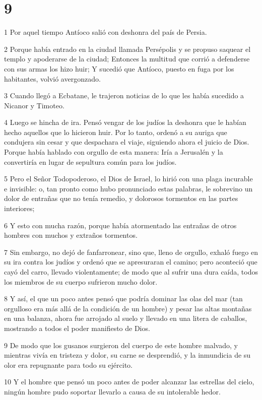 \chapter{9}

\par 1 Por aquel tiempo Antíoco salió con deshonra del país de Persia.
\par 2 Porque había entrado en la ciudad llamada Persépolis y se propuso saquear el templo y apoderarse de la ciudad; Entonces la multitud que corrió a defenderse con sus armas los hizo huir; Y sucedió que Antíoco, puesto en fuga por los habitantes, volvió avergonzado.
\par 3 Cuando llegó a Ecbatane, le trajeron noticias de lo que les había sucedido a Nicanor y Timoteo.
\par 4 Luego se hincha de ira. Pensó vengar de los judíos la deshonra que le habían hecho aquellos que lo hicieron huir. Por lo tanto, ordenó a su auriga que condujera sin cesar y que despachara el viaje, siguiendo ahora el juicio de Dios. Porque había hablado con orgullo de esta manera: Iría a Jerusalén y la convertiría en lugar de sepultura común para los judíos.
\par 5 Pero el Señor Todopoderoso, el Dios de Israel, lo hirió con una plaga incurable e invisible: o, tan pronto como hubo pronunciado estas palabras, le sobrevino un dolor de entrañas que no tenía remedio, y dolorosos tormentos en las partes interiores;
\par 6 Y esto con mucha razón, porque había atormentado las entrañas de otros hombres con muchos y extraños tormentos.
\par 7 Sin embargo, no dejó de fanfarronear, sino que, lleno de orgullo, exhaló fuego en su ira contra los judíos y ordenó que se apresuraran el camino; pero aconteció que cayó del carro, llevado violentamente; de modo que al sufrir una dura caída, todos los miembros de su cuerpo sufrieron mucho dolor.
\par 8 Y así, el que un poco antes pensó que podría dominar las olas del mar (tan orgulloso era más allá de la condición de un hombre) y pesar las altas montañas en una balanza, ahora fue arrojado al suelo y llevado en una litera de caballos, mostrando a todos el poder manifiesto de Dios.
\par 9 De modo que los gusanos surgieron del cuerpo de este hombre malvado, y mientras vivía en tristeza y dolor, su carne se desprendió, y la inmundicia de su olor era repugnante para todo su ejército.
\par 10 Y el hombre que pensó un poco antes de poder alcanzar las estrellas del cielo, ningún hombre pudo soportar llevarlo a causa de su intolerable hedor.
